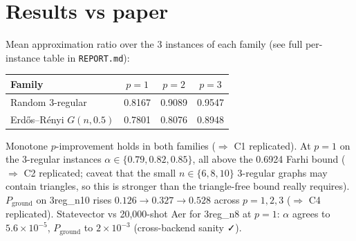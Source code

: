 \documentclass[11pt]{article}
\begin{document}
\section{Results vs paper}
Mean approximation ratio over the 3 instances of each family (see full per-instance table in \texttt{REPORT.md}):
\begin{center}
\begin{tabular}{lccc}
\toprule
Family & $p=1$ & $p=2$ & $p=3$ \\
\midrule
Random 3-regular  & 0.8167 & 0.9089 & 0.9547 \\
Erd\H{o}s--R\'enyi $G(n,0.5)$ & 0.7801 & 0.8076 & 0.8948 \\
\bottomrule
\end{tabular}
\end{center}
Monotone $p$-improvement holds in both families ($\Rightarrow$ C1 replicated).
At $p=1$ on the 3-regular instances $\alpha\in\{0.79, 0.82, 0.85\}$, all above the 0.6924 Farhi bound ($\Rightarrow$ C2 replicated; caveat that the small $n\in\{6,8,10\}$ 3-regular graphs may contain triangles, so this is stronger than the triangle-free bound really requires).
$P_{\text{ground}}$ on 3reg\_n10 rises $0.126\to 0.327\to 0.528$ across $p=1,2,3$ ($\Rightarrow$ C4 replicated).
Statevector vs 20{,}000-shot Aer for 3reg\_n8 at $p=1$: $\alpha$ agrees to $5.6\times 10^{-5}$, $P_{\text{ground}}$ to $2\times 10^{-3}$ (cross-backend sanity ✓).
\end{document}
